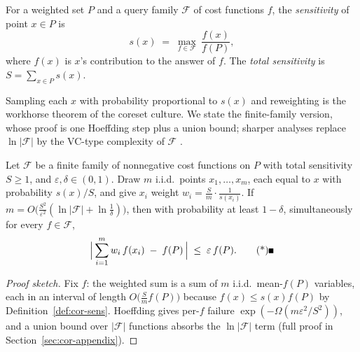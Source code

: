 \begin{definition}[Sensitivity]\label{def:cor-sens}
For a weighted set $P$ and a query family $\mathcal{F}$ of cost
functions $f$, the \emph{sensitivity} of point $x \in P$ is
\[
s(x) \;=\; \max_{f \in \mathcal{F}}\ \frac{f(x)}{f(P)},
\]
where $f(x)$ is $x$'s contribution to the answer of $f$. The
\emph{total sensitivity} is $S = \sum_{x \in P} s(x)$.
\end{definition}

Sampling each $x$ with probability proportional to $s(x)$ and
reweighting is the workhorse theorem of the coreset culture. We state
the finite-family version, whose proof is one Hoeffding step plus a
union bound; sharper analyses replace $\ln|\mathcal{F}|$ by the VC-type
complexity of $\mathcal{F}$ \citep{coresets-rnla-bg9,coresets-rnla-bg10}.

\begin{theorem}\label{thm:cor-sens}
Let $\mathcal{F}$ be a finite family of nonnegative cost functions on
$P$ with total sensitivity $S \ge 1$, and $\varepsilon, \delta \in
(0,1)$. Draw $m$ i.i.d.\ points $x_1,\dots,x_m$, each equal to $x$ with
probability $s(x)/S$, and give $x_i$ weight $w_i =
\frac{S}{m}\cdot\frac{1}{s(x_i)}$. If $m =
O\bigl(\tfrac{S^2}{\varepsilon^2}
(\ln|\mathcal{F}| + \ln\tfrac{1}{\delta})\bigr)$, then with probability
at least $1-\delta$, simultaneously for every $f \in \mathcal{F}$,
\[
\Bigl|\, \sum_{i=1}^m w_i\, f(x_i) \;-\; f(P) \,\Bigr| \;\le\;
\varepsilon\, f(P). \eopm
\]
\end{theorem}

\begin{proof}[Proof sketch]
Fix $f$: the weighted sum is a sum of $m$ i.i.d.\ mean-$f(P)$ variables,
each in an interval of length $O\bigl(\tfrac{S}{m} f(P)\bigr)$ because
$f(x) \le s(x) f(P)$ by Definition~\ref{def:cor-sens}. Hoeffding gives
per-$f$ failure $\exp(-\Omega(m\varepsilon^2/S^2))$, and a union bound
over $|\mathcal{F}|$ functions absorbs the $\ln|\mathcal{F}|$ term (full
proof in Section~\ref{sec:cor-appendix}).
\end{proof}



